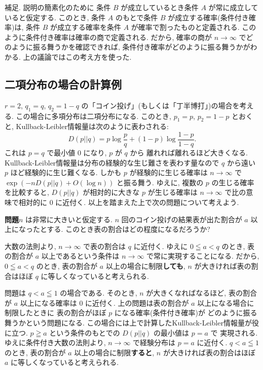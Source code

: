 \documentclass[12pt,twoside]{jarticle}
\theoremstyle{jplain}
\theoremstyle{jplain}
\theoremstyle{jplain}
\numberwithin{theorem}{section}
\numberwithin{equation}{section}
\numberwithin{figure}{section}
\numberwithin{table}{section}
\begin{document}
補足. 説明の簡素化のために
条件 $B$ が成立しているとき条件 $A$ が常に成立していると仮定する.
このとき, 条件 $A$ のもとで条件 $B$ が成立する確率(条件付き確率)は, 
条件 $B$ が成立する確率を条件 $A$ が確率で割ったものと定義される.
このように条件付き確率は確率の商で定義される.
だから, 確率の商が $n\to\infty$ でどのように振る舞うかを確認できれば,
条件付き確率がどのように振る舞うかがわかる. 
上の議論ではこの考え方を使った.


\subsection{二項分布の場合の計算例}
\label{sec:binom-Sanov}

$r=2$, $q_1=q$, $q_2=1-q$ の「コイン投げ」(もしくは「丁半博打」)の場合を考える.
この場合に多項分布は二項分布になる.
このとき, $p_1=p$, $p_2=1-p$ とおくと, 
Kullback-Leibler情報量は次のように表わされる:
\[
D(p||q)=p\log \frac{p}{q}+(1-p)\log\frac{1-p}{1-q}. 
\]
これは $p=q$ で最小値 $0$ になり, $p$ が $q$ から
離れれば離れるほど大きくなる.
Kullback-Leibler情報量は分布の経験的な生じ難さを表わす量なので
$q$ から遠い $p$ ほど経験的に生じ難くなる.
しかも $p$ が経験的に生じる確率は $n\to\infty$ で
$\exp(-nD(p||q)+O(\log n))$ と振る舞う.
ゆえに, 複数の $p$ の生じる確率を比較すると, 
$D(p||q)$ が相対的に大きな $p$ が生じる確率は
$n\to\infty$ で比の意味で相対的に $0$ に近付く. 
以上を踏まえた上で次の問題について考えよう.

\medskip

{\bf 問題}\enspace $n$ は非常に大きいと仮定する.
$n$ 回のコイン投げの結果表が出た割合が $a$ 以上になったとする.
このとき表の割合はどの程度になるだろうか?

\medskip

大数の法則より, $n\to\infty$ で表の割合は $q$ に近付く.
ゆえに $0\leqq a<q$ のとき, 表の割合が $a$ 以上であるという条件は
$n\to\infty$ で常に実現することになる.
だから, $0\leqq a<q$ のとき, 表の割合が $a$ 以上の場合に制限{\bf しても}, 
$n$ が大きければ表の割合はほぼ $q$ に等しくなっていると考えられる.

問題は $q<a\leqq 1$ の場合である. 
そのとき, $n$ が大きくなればなるほど, 
表の割合が $a$ 以上になる確率は $0$ に近付く.  
上の問題は表の割合が $a$ 以上になる場合に制限したときに
表の割合がほぼ $p$ になる確率(条件付き確率)が
どのように振る舞うかという問題になる.
この場合には上で計算したKullback-Leibler情報量が役に立つ.
$p\geqq a$ という条件のもとでの $D(p||q)$ の最小値は $p=a$ で
実現される. ゆえに条件付き大数の法則より, 
$n\to\infty$ で経験分布は $p=a$ に近付く.
$q<a\leqq 1$ のとき, 表の割合が $a$ 以上の場合に制限{\bf すると}, 
$n$ が大きければ表の割合はほぼ $a$ に等しくなっていると考えられる.
\end{document}
